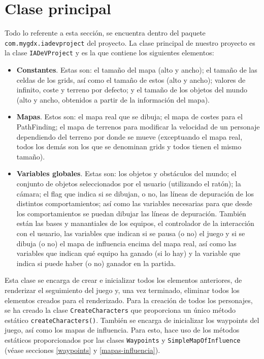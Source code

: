\medskip
\section{Clase principal}
Todo lo referente a esta sección, se encuentra dentro del paquete \texttt{com.mygdx.iadevproject} del proyecto. La clase principal de nuestro proyecto es la clase \texttt{IADeVProject} y es la que contiene los siguientes elementos:
\begin{itemize}
 \item \textbf{Constantes}. Estas son: el tamaño del mapa (alto y ancho); el tamaño de las celdas de los grids, así como el tamaño de estos (alto y ancho); valores de infinito, coste y terreno por defecto; y el tamaño de los objetos del mundo (alto y ancho, obtenidos a partir de la información del mapa).
 \item \textbf{Mapas}. Estos son: el mapa real que se dibuja; el mapa de costes para el PathFinding; el mapa de terrenos para modificar la velocidad de un personaje dependiendo del terreno por donde se mueve (exceptuando el mapa real, todos los demás son los que se denominan grids y todos tienen el mismo tamaño).
 \item \textbf{Variables globales}. Estas son: los objetos y obstáculos del mundo; el conjunto de objetos seleccionados por el usuario (utilizando el ratón); la cámara; el flag que indica si se dibujan, o no, las líneas de depuración de los distintos comportamientos; así como las variables necesarias para que desde los comportamientos se puedan dibujar las líneas de depuración. También están las bases y manantiales de los equipos, el controlador de la interacción con el usuario, las variables que indican si se pausa (o no) el juego y si se dibuja (o no) el mapa de influencia encima del mapa real, así como las variables que indican qué equipo ha ganado (si lo hay) y la variable que indica si puede haber (o no) ganador en la partida.
\end{itemize}

Esta clase se encarga de crear e inicializar todos los elementos anteriores, de renderizar el seguimiento del juego y, una vez terminado, eliminar todos los elementos creados para el renderizado. Para la creación de todos los personajes, se ha creado la clase \texttt{CreateCharacters} que proporciona un único método estático \texttt{createCharacters()}. También se encarga de inicializar los waypoints del juego, así como los mapas de influencia. Para esto, hace uso de los métodos estáticos proporcionados por las clases \texttt{Waypoints} y \texttt{SimpleMapOfInfluence} (véase secciones \ref{waypoints} y \ref{mapas-influencia}).\\

